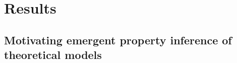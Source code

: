\documentclass[11pt]{article}
\begin{document}



\section{Results}
\subsection{Motivating emergent property inference of theoretical models} \label{results_motivating}
\end{document}
